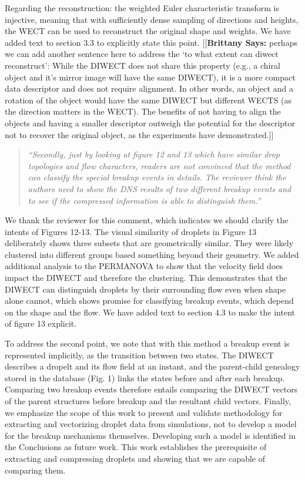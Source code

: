 \documentclass[11pt]{article}
\newcommand{\payAttention}[3]{{\color{#1}[[\textbf{#2: }#3]]}}
\newcommand{\xSays}[3]{\payAttention{#1}{#2 Says}{#3}}
\newcommand{\brittany}[1]{\xSays{blue}{Brittany}{#1}}
\begin{document}
Regarding the reconstruction: the weighted Euler characteristic transform is
injective, meaning that with sufficiently dense sampling of directions and
heights, the WECT can be used to reconstruct the original shape and weights. We
have added text to section 3.3 to explicitly state this point.
\brittany{perhaps we can add another sentence here to address the `to what
extent can diwect reconstruct': While the DIWECT does not share this property
(e.g., a chiral object and it's mirror image will have the same DIWECT), it is a
more compact data descriptor and does not require alignment. In other words,
an object and a
rotation of the object would have the same DIWECT but different WECTS (as the
direction matters in the WECT). The benefits of not having to align the objects
and having a smaller descriptor outweigh the potential for the descriptor not to
recover the original object, as the experiments have demonstrated.}

\begin{quote}
    {\it ``Secondly, just by looking at figure 12 and 13 which have similar drop topologies and flow characters, readers are not convinced that the method can classify the special breakup events in details. The reviewer think the authors need to show the DNS results of two different breakup events and to see if the compressed information is able to distinguish them.''}
\end{quote}

We thank the reviewer for this comment, which indicates we should clarify the intents of Figures 12-13. The visual similarity of droplets in Figure 13 deliberately shows three subsets that are geometrically similar. They were likely clustered into different groups based something beyond their geometry. We added additional analysis to the PERMANOVA to show that the velocity field does impact the DIWECT and therefore the clustering. This demonstrates that the DIWECT can distinguish droplets by their surrounding flow even when shape alone cannot, which shows promise for classifying breakup events, which depend on the shape and the flow. We have added text to section 4.3 to make the intent of figure 13 explicit.

To address the second point, we note that with this method a breakup event is represented implicitly, as the transition between two states. The DIWECT describes a dropelt and its flow field at an instant, and the parent-child genealogy stored in the database (Fig. 1) links the states before and after each breakup. Comparing two breakup events therefore entails comparing the DIWECT vectors of the parent structures before breakup and the resultant child vectors. Finally, we emphasize the scope of this work to present and validate methodology for extracting and vectorizing droplet data from simulations, not to develop a model for the breakup mechanisms themselves. Developing such a model is identified in the Conclusions as future work. This work establishes the prerequisite of extracting and compressing droplets and showing that we are capable of comparing them.
\end{document}
